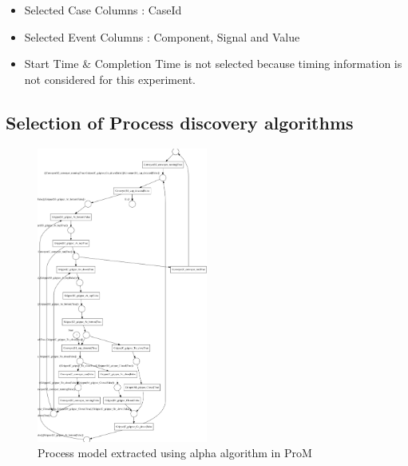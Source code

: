 \documentclass[conference]{IEEEtran}
\begin{document}
\begin{itemize}
  \item Selected Case Columns : CaseId
  \item Selected Event Columns : Component, Signal and Value
  \item Start Time \& Completion Time is not selected because timing information is not considered for this experiment.
\end{itemize}

\subsection{Selection of Process discovery algorithms }

\begin{figure}[!t]
	\centering
	\includegraphics[width=0.5\textwidth]{images/PN.PNG}
	\caption{Process model extracted using alpha algorithm in ProM}
	\label{fig:PN}
\end{figure}
\end{document}
